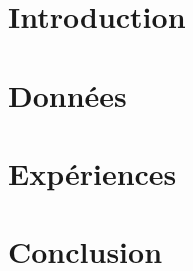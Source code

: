 \documentclass[
    iict, %
    il, %
]{heig-tb}
\begin{document}
\maketitle
\frontmatter
\clearemptydoublepage

\preamble
\authentification

\begin{abstract}
    
\end{abstract}

\clearemptydoublepage
{
    \tableofcontents
    \let\cleardoublepage\clearpage
    \listoffigures
    \let\cleardoublepage\clearpage
    \listoftables
}

\printnomenclature
\clearemptydoublepage
{}

\mainmatter
\chapter{Introduction}

\chapter{Données}

%
\chapter{Expériences}

\chapter{Conclusion}


\clearpage
\printbibliography

\appendix
\appendixpage
\addappheadtotoc
\end{document}
